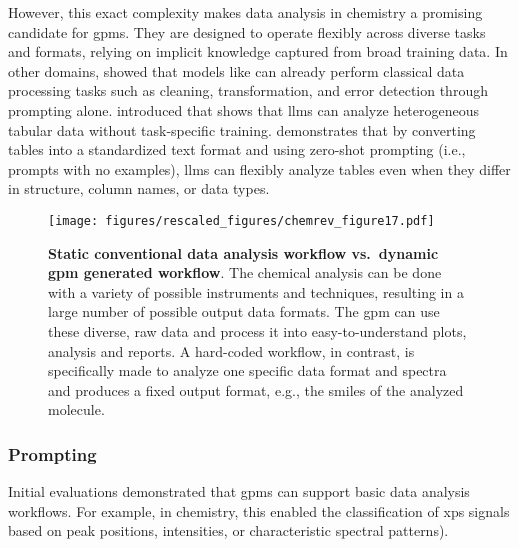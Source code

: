 However, this exact complexity makes data analysis in chemistry a promising candidate for \glspl{gpm}. 
They are designed to operate flexibly across diverse tasks and formats, relying on implicit knowledge captured from broad training data. 
In other domains, \textcite{narayan2022can} showed that models like  can already perform classical data processing tasks such as cleaning, transformation, and error detection through prompting alone. \textcite{kayali2023chorus} introduced  that shows that \glspl{llm} can analyze heterogeneous tabular data without task-specific training. 
 demonstrates that by converting tables into a standardized text format and using zero-shot prompting (i.e., prompts with no examples), \glspl{llm} can flexibly analyze tables even when they differ in structure, column names, or data types.

\begin{figure}[!ht]
    \centering
\texttt{[image: figures/rescaled\_figures/chemrev\_figure17.pdf]}
    \caption{\textbf{Static conventional data analysis workflow vs.\ dynamic \gls{gpm} generated workflow}. The chemical analysis can be done with a variety of possible instruments and techniques, resulting in a large number of possible output data formats. The \gls{gpm} can use these diverse, raw data and process it into easy-to-understand plots, analysis and reports. A hard-coded workflow, in contrast, is specifically made to analyze one specific data format and spectra and produces a fixed output format, e.g., the \gls{smiles} of the analyzed molecule.}
    \label{fig:anaylsis}
\end{figure}


 \subsubsection{Prompting} Initial evaluations demonstrated that \glspl{gpm} can support basic data analysis workflows. \autocite{Fu2025large} 
 For example, in chemistry, this enabled the classification of \gls{xps} signals \autocite{decurt2024large} based on peak positions, intensities, or characteristic spectral patterns).  
 
